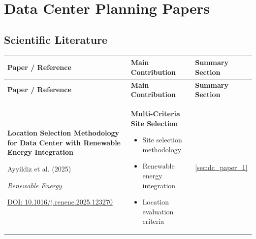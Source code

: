 
\chapter{Data Center Planning Papers}
\label{chap:datacenter_papers}

\section{Scientific Literature}

\renewcommand{\arraystretch}{1.5}
\setlength{\tabcolsep}{5pt}
\small

\begin{longtable}{
    |p{7.0cm}|p{5.8cm}|p{2.2cm}|
}

\hline
\rowcolor{header}
\color{white}\textbf{Paper / Reference} &
\color{white}\textbf{Main Contribution} &
\color{white}\textbf{Summary Section} \\ \hline
\endfirsthead

\hline
\rowcolor{header}
\color{white}\textbf{Paper / Reference} &
\color{white}\textbf{Main Contribution} &
\color{white}\textbf{Summary Section} \\ \hline
\endhead

\rowcolor{green!8}
\textbf{Location Selection Methodology for Data Center
with Renewable Energy Integration}

Ayyildiz et al. (2025)

\textit{Renewable Energy}

\href{https://doi.org/10.1016/j.renene.2025.123270}
{DOI: 10.1016/j.renene.2025.123270}
&
\textbf{Multi-Criteria Site Selection}
\begin{itemize}
    \setlength{\itemsep}{0pt}
    \setlength{\topsep}{0pt}
    \item Site selection methodology
    \item Renewable energy integration
    \item Location evaluation criteria
\end{itemize}
&
{\centering\hyperref[sec:dc_paper_1]{\ref*{sec:dc_paper_1}}}
\\ \hline



\end{longtable}
